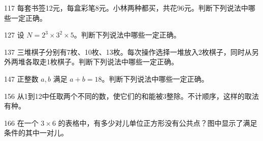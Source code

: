 
\begin{question}{11}{7}
每套书签12元，每盒彩笔8元。小林两种都买，共花96元。判断下列说法中哪些一定正确。
\begin{multichoices}
\end{multichoices}
\end{question}

\begin{question}{12}{7}
设 \(N=2^3\times3^2\times5\)。判断下列说法中哪些一定正确。
\begin{multichoices}
\end{multichoices}
\end{question}

\begin{question}{13}{7}
三堆棋子分别有7枚、10枚、13枚。每次操作选择一堆放入2枚棋子，同时从另外两堆各取走1枚棋子。判断下列说法中哪些一定正确。
\begin{multichoices}
\end{multichoices}
\end{question}

\begin{question}{14}{7}
正整数 \(a,b\) 满足 \(a+b=18\)。判断下列说法中哪些一定正确。
\begin{multichoices}
\end{multichoices}
\end{question}


\begin{question}{15}{6}
从1到12中任取两个不同的数，使它们的和能被3整除。不计顺序，这样的取法有\underline{\hspace{1.35cm}}种。
\end{question}

\begin{question}{16}{6}
在一个 \(3\times6\) 的表格中，有多少对儿单位正方形没有公共点？图中显示了满足条件的其中一对儿。

\noindent
{}

\end{question}

